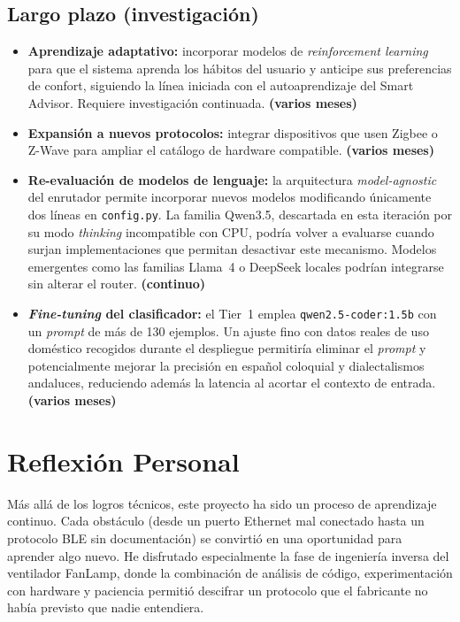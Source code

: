 \subsection*{Largo plazo (investigación)}
\begin{itemize}
    \item \textbf{Aprendizaje adaptativo:} incorporar modelos de \textit{reinforcement learning} para que el sistema aprenda los hábitos del usuario y anticipe sus preferencias de confort, siguiendo la línea iniciada con el autoaprendizaje del Smart Advisor. Requiere investigación continuada. \hfill \textbf{(varios meses)}

    \item \textbf{Expansión a nuevos protocolos:} integrar dispositivos que usen Zigbee o Z-Wave para ampliar el catálogo de hardware compatible. \hfill \textbf{(varios meses)}

    \item \textbf{Re-evaluación de modelos de lenguaje:} la arquitectura \textit{model-agnostic} del enrutador permite incorporar nuevos modelos modificando únicamente dos líneas en \texttt{config.py}. La familia Qwen3.5, descartada en esta iteración por su modo \textit{thinking} incompatible con CPU, podría volver a evaluarse cuando surjan implementaciones que permitan desactivar este mecanismo. Modelos emergentes como las familias Llama~4 o DeepSeek locales podrían integrarse sin alterar el router. \hfill \textbf{(continuo)}

    \item \textbf{\textit{Fine-tuning} del clasificador:} el Tier~1 emplea \texttt{qwen2.5-coder:1.5b} con un \textit{prompt} de más de 130 ejemplos. Un ajuste fino con datos reales de uso doméstico recogidos durante el despliegue permitiría eliminar el \textit{prompt} y potencialmente mejorar la precisión en español coloquial y dialectalismos andaluces, reduciendo además la latencia al acortar el contexto de entrada. \hfill \textbf{(varios meses)}
\end{itemize}

\section{Reflexión Personal}

Más allá de los logros técnicos, este proyecto ha sido un proceso de aprendizaje continuo. Cada obstáculo (desde un puerto Ethernet mal conectado hasta un protocolo BLE sin documentación) se convirtió en una oportunidad para aprender algo nuevo. He disfrutado especialmente la fase de ingeniería inversa del ventilador FanLamp, donde la combinación de análisis de código, experimentación con hardware y paciencia permitió descifrar un protocolo que el fabricante no había previsto que nadie entendiera.

